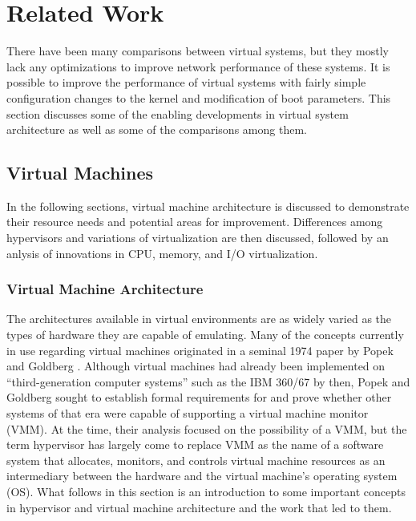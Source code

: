\chapter{Related Work}
\label{sec:related_work}
There have been many comparisons between virtual systems, but they mostly lack any optimizations to improve network performance of these systems.
It is possible to improve the performance of virtual systems with fairly simple configuration changes to the kernel and modification of boot parameters.
This section discusses some of the enabling developments in virtual system architecture as well as some of the comparisons among them.  

\section{Virtual Machines}
\label{sec:virtualmachines}
In the following sections, virtual machine architecture is discussed to demonstrate their resource needs and potential areas for improvement.
Differences among hypervisors and variations of virtualization are then discussed, followed by an anlysis of innovations in CPU, memory, and I/O virtualization.  

\subsection{Virtual Machine Architecture}
\label{sec:vmarchitecture}
The architectures available in virtual environments are as widely varied as the types of hardware they are capable of emulating.
Many of the concepts currently in use regarding virtual machines originated in a seminal 1974 paper by Popek and Goldberg \autocite{_popek_1}.
Although virtual machines had already been implemented on ``third-generation computer systems'' such as the IBM 360/67 by then, Popek and Goldberg sought to establish formal requirements for and prove whether other systems of that era were capable of supporting a virtual machine monitor (VMM)\autocite{_popek_1}.
At the time, their analysis focused on the possibility of a VMM, but the term hypervisor has largely come to replace VMM as the name of a software system that allocates, monitors, and controls virtual machine resources as an intermediary between the hardware and the virtual machine's operating system (OS).
What follows in this section is an introduction to some important concepts in hypervisor and virtual machine architecture and the work that led to them.

